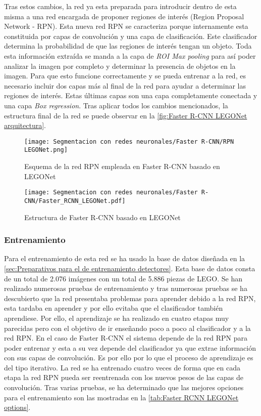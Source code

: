 Tras estos cambios, la red ya esta preparada para introducir dentro de esta misma a una red encargada de proponer regiones de interés (Region Proposal Network - RPN). Esta nueva red RPN se caracteriza porque internamente esta constituida por capas de convolución y una capa de clasificación. Este clasificador determina la probabilidad de que las regiones de interés tengan un objeto. Toda esta información extraída se manda a la capa de \textit{ROI Max pooling} para así poder analizar la imagen por completo y determinar la presencia de objetos en la imagen. Para que esto funcione correctamente y se pueda entrenar a la red, es necesario incluir dos capas más al final de la red para ayudar a determinar las regiones de interés. Estas últimas capas son una capa completamente conectada y una capa \textit{Box regression}. Tras aplicar todos los cambios mencionados, la estructura final de la red se puede observar en la \autoref{fig:Faster R-CNN LEGONet arquitectura}.

\begin{figure}[ht]  %
	\centering
	\texttt{[image: Segmentacion con redes neuronales/Faster R-CNN/RPN LEGONet.png]}
	\caption{Esquema de la red RPN empleada en Faster R-CNN basado en LEGONet}
	\label{fig:Faster R-CNN RPN}
\end{figure}

\begin{figure}[ht]  %
	\centering
	\texttt{[image: Segmentacion con redes neuronales/Faster R-CNN/Faster\_RCNN\_LEGONet.pdf]}
	\caption{Estructura de Faster R-CNN basado en LEGONet}
	\label{fig:Faster R-CNN LEGONet arquitectura}
\end{figure}


\subsubsection*{Entrenamiento}
Para el entrenamiento de esta red se ha usado la base de datos diseñada en la \autoref{sec:Preparativos para el de entrenamiento detectores}. Esta base de datos consta de un total de 2.076 imágenes con un total de 5.886 piezas de LEGO. Se han realizado numerosas pruebas de entrenamiento y tras numerosas pruebas se ha descubierto que la red presentaba problemas para aprender debido a la red RPN, esta tardaba en aprender y por ello evitaba que el clasificador también aprendiese. Por ello, el aprendizaje se ha realizado en cuatro etapas muy parecidas pero con el objetivo de ir enseñando poco a poco al clasificador y a la red RPN. En el caso de Faster R-CNN el sistema depende de la red RPN para poder entrenar y esta a su vez depende del clasificador ya que extrae información con sus capas de convolución. Es por ello por lo que el proceso de aprendizaje es del tipo iterativo. La red se ha entrenado cuatro veces de forma que en cada etapa la red RPN pueda ser reentrenada con los nuevos pesos de las capas de convolución. Tras varias pruebas, se ha determinado que las mejores opciones para el entrenamiento son las mostradas en la \autoref{tab:Faster RCNN LEGONet options}.


